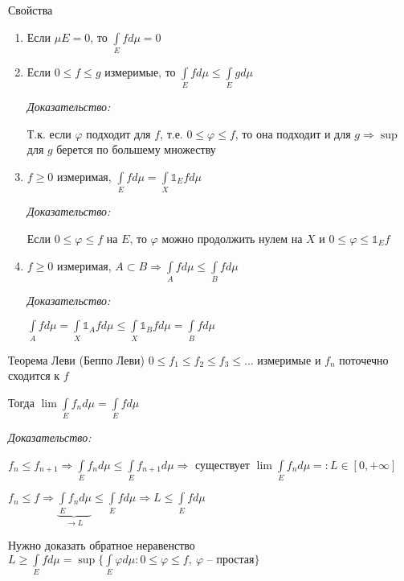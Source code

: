 \documentclass[12pt]{article}
\begin{document}
\begin{theo}{Свойства}
    \begin{enumerate}
        \item Если $\mu E = 0$, то $\int\limits_E fd\mu = 0$
        \item Если $0 \leq f \leq g$ измеримые, то $\int\limits_E fd\mu \leq \int\limits_E gd\mu$
        
        \textit{Доказательство:}
        
        Т.к. если $\varphi$ подходит для $f$, т.е. $0 \leq \varphi \leq f$, то она подходит и для $g \Rightarrow \sup$ для $g$ берется по большему множеству

        \item $f \geq 0$ измеримая, $\int\limits_E fd\mu = \int\limits_X \mathbb{1}_E fd\mu$
        
        \textit{Доказательство:}

        Если $0 \leq \varphi \leq f$ на $E$, то $\varphi$ можно продолжить нулем на $X$ и $0 \leq \varphi \leq \mathbb{1}_E f$ 

        \item $f \geq 0$ измеримая, $A \subset B \Rightarrow \int\limits_A fd\mu \leq \int\limits_B fd\mu$
        
        \textit{Доказательство:}

        $\int\limits_A fd\mu = \int\limits_X \mathbb{1}_A fd\mu \leq \int\limits_X \mathbb{1}_B fd\mu = \int\limits_B fd\mu$
    \end{enumerate}
\end{theo}

\begin{theo}{Теорема Леви (Беппо Леви)}
    $0 \leq f_1 \leq f_2 \leq f_3 \leq \ldots$ измеримые и $f_n$ поточечно сходится к $f$

    Тогда $\lim\int\limits_E f_n d\mu = \int\limits_E fd\mu$
\end{theo}

\textit{Доказательство:}

$f_n \leq f_{n + 1} \Rightarrow \int\limits_E f_nd\mu \leq \int\limits_E f_{n + 1}d\mu \Rightarrow$ существует $\lim\int\limits_E f_nd\mu =: L \in [0, + \infty]$

$f_n \leq f \Rightarrow \underbrace{\int\limits_E f_nd\mu}_{\to L} \leq \int\limits_E fd\mu \Rightarrow L \leq \int\limits_E fd\mu$

Нужно доказать обратное неравенство $L \geq \int\limits_E fd\mu = \sup\{\int\limits_E \varphi d\mu : 0 \leq \varphi \leq f,\ \varphi \text{ -- простая}\}$
\end{document}
